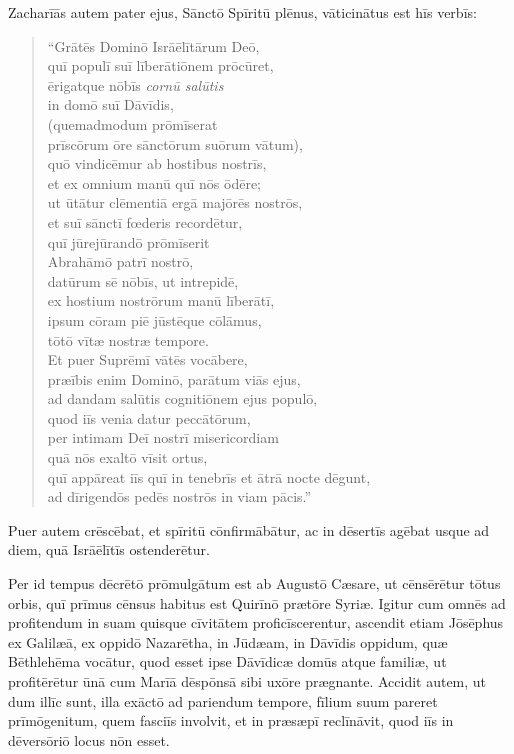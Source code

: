 \Versus Zacharīās autem pater ejus, Sānctō Spīritū plēnus, vāticinātus est hīs verbīs:
\begin{verse}
\begin{patverse*}
\Versus ``Grātēs Dominō Isrāēlītārum Deō,\\
quī populī suī līberātiōnem prōcūret,\\
\Versus ērigatque nōbīs \emph{cornū salūtis}\\
in domō suī Dāvīdis,\\
\Versus (quemadmodum prōmīserat\\
prīscōrum ōre sānctōrum suōrum vātum),\\
\Versus quō vindicēmur ab hostibus nostrīs,\\
et ex omnium manū quī nōs ōdēre;\\
\Versus ut ūtātur clēmentiā ergā majōrēs nostrōs,\\
et suī sānctī fœderis recordētur,\\
\Versus quī jūrejūrandō prōmīserit\\
Abrahāmō patrī nostrō,\\
\Versus datūrum sē nōbīs, ut intrepidē,\\
ex hostium nostrōrum manū līberātī,\\
\Versus ipsum cōram piē jūstēque cōlāmus,\\
tōtō vītæ nostræ tempore.\\
\medskip
\Versus Et puer Suprēmī vātēs vocābere,\\
præībis enim Dominō, parātum viās ejus,\\
\Versus ad dandam salūtis cognitiōnem ejus populō,\\
quod iīs venia datur peccātōrum,\\
\Versus per intimam Deī nostrī misericordiam\\
quā nōs exaltō vīsit ortus,\\
\Versus quī appāreat iīs quī in tenebrīs et ātrā nocte dēgunt,\\
ad dīrigendōs pedēs nostrōs in viam pācis.''
\end{patverse*}
\end{verse}

\Versus Puer autem crēscēbat, et spīritū cōnfirmābātur, ac in dēsertīs agēbat usque ad diem, quā Isrāēlītīs ostenderētur.



\Caput
\Versus Per id tempus dēcrētō prōmulgātum est ab Augustō Cæsare, ut cēnsērētur tōtus orbis,
\Versus quī prīmus cēnsus habitus est Quirīnō prætōre Syriæ.
\Versus Igitur cum omnēs ad profitendum in suam quisque cīvitātem proficīscerentur,
\Versus ascendit etiam Jōsēphus ex Galilæā, ex oppidō Nazarētha, in Jūdæam, in Dāvīdis oppidum, quæ Bēthlehēma vocātur, quod esset ipse Dāvīdicæ domūs atque familiæ,
\Versus ut profitērētur ūnā cum Marīā dēspōnsā sibi uxōre prægnante.
\Versus Accidit autem, ut dum illīc sunt, illa exāctō ad pariendum tempore,
\Versus fīlium suum pareret prīmōgenitum, quem fasciīs involvit, et in præsæpī reclīnāvit, quod iīs in dēversōriō locus nōn esset.

